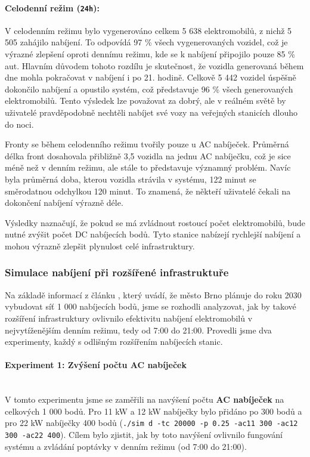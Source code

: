 \documentclass[a4paper,11pt]{article}
\begin{document}
\paragraph{Celodenní režim (\texttt{24h}):} 
V celodenním režimu bylo vygenerováno celkem 5 638 elektromobilů, z nichž 5 505 zahájilo nabíjení. To odpovídá 97 \% všech vygenerovaných vozidel, což je výrazné zlepšení oproti dennímu režimu, kde se k nabíjení připojilo pouze 85 \% aut. Hlavním důvodem tohoto rozdílu je skutečnost, že vozidla generovaná během dne mohla pokračovat v nabíjení i po 21. hodině. Celkově 5 442 vozidel úspěšně dokončilo nabíjení a opustilo systém, což představuje 96 \% všech generovaných elektromobilů. Tento výsledek lze považovat za dobrý, ale v reálném světě by uživatelé pravděpodobně nechtěli nabíjet své vozy na veřejných stanicích dlouho do noci.

Fronty se během celodenního režimu tvořily pouze u AC nabíječek. Průměrná délka front dosahovala přibližně 3,5 vozidla na jednu AC nabíječku, což je sice méně než v denním režimu, ale stále to představuje významný problém. Navíc byla průměrná doba, kterou vozidla strávila v systému, 122 minut se směrodatnou odchylkou 120 minut. To znamená, že někteří uživatelé čekali na dokončení nabíjení výrazně déle.

Výsledky naznačují, že pokud se má zvládnout rostoucí počet elektromobilů, bude nutné zvýšit počet DC nabíjecích bodů. Tyto stanice nabízejí rychlejší nabíjení a mohou výrazně zlepšit plynulost celé infrastruktury.


\subsubsection{Simulace nabíjení při rozšířené infrastruktuře}

Na základě informací z článku \cite{ev_growth}, který uvádí, že město Brno plánuje do roku 2030 vybudovat síť 1 000 nabíjecích bodů, jsme se rozhodli analyzovat, jak by takové rozšíření infrastruktury ovlivnilo efektivitu nabíjení elektromobilů v nejvytíženějším denním režimu, tedy od 7:00 do 21:00. Provedli jsme dva experimenty, každý s odlišným rozšířením nabíjecích stanic.


\paragraph{Experiment 1: Zvýšení počtu AC nabíječek\\\\}
V tomto experimentu jsme se zaměřili na navýšení počtu \textbf{AC nabíječek} na celkových 1 000 bodů. Pro 11 kW a 12 kW nabíječky bylo přidáno po 300 bodů a pro 22 kW nabíječky 400 bodů (\texttt{./sim d -tc 20000 -p 0.25 -ac11 300 -ac12 300 -ac22 400}). Cílem bylo zjistit, jak by toto navýšení ovlivnilo fungování systému a zvládání poptávky v denním režimu (od 7:00 do 21:00).
\end{document}
